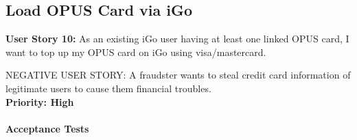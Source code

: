 \documentclass[11pt, english]{report}
\begin{document}
\vspace*{0.2in}
\subsection{Load OPUS Card via iGo}
\textbf{User Story 10: }
As an existing iGo user having at least one linked OPUS card, I want to top up my OPUS card on iGo using visa/mastercard.

NEGATIVE USER STORY:
A fraudster wants to steal credit card information of legitimate users to cause them financial troubles.
\\ 
\textbf{Priority: High}\\ \\
\textbf{Acceptance Tests} \\ \\ 
\setlength{\tabcolsep}{18pt}
\renewcommand{\arraystretch}{1.5}
\end{document}
